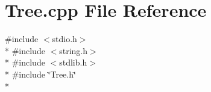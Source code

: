 \section{Tree.\+cpp File Reference}
\label{Tree_8cpp}
{\ttfamily \#include $<$stdio.\+h$>$}\\*
{\ttfamily \#include $<$string.\+h$>$}\\*
{\ttfamily \#include $<$stdlib.\+h$>$}\\*
{\ttfamily \#include \char`\"{}Tree.\+h\char`\"{}}\\*
